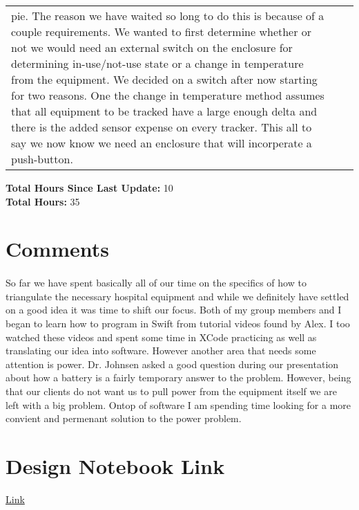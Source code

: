 \documentclass[11pt]{report}
\begin{document}
\begin{center}
{{\begin{tabular}{m{4cm} m{2cm} m{10cm}}
		pie.  The reason we have waited so long to do this is because of a couple requirements.  
		We wanted to first determine whether or not we would need an external switch on the 
		enclosure for determining in-use/not-use state or a change in temperature from the 
		equipment.  We decided on a switch after now starting for two reasons.  One the change 
		in temperature method assumes that all equipment to be tracked have a large enough delta 
		and there is the added sensor expense on every tracker.  This all to say we now know we 
		need an enclosure that will incorperate a push-button.\\
		\end{tabular}
		}
		}
	\end{center}
		\textbf{Total Hours Since Last Update: } 10\\
		\textbf{Total Hours: } 35

\newpage

\section*{Comments}
	\paragraph*{}
		So far we have spent basically all of our time on the specifics of how to triangulate the 
		necessary hospital equipment and while we definitely have settled on a good idea it was 
		time to shift our focus.  Both of my group members and I began to learn how to program in
		Swift from tutorial videos found by Alex.  I too watched these videos and spent some time 
		in XCode practicing as well as translating our idea into software.  However another area 
		that needs some attention is power.  Dr. Johnsen asked a good question during our 
		presentation about how a battery is a fairly temporary answer to the problem.  However, 
		being that our clients do not want us to pull power from the equipment itself we are left 
		with a big problem.  Ontop of software I am spending time looking for a more convient and 
		permenant solution to the power problem.

\section*{Design Notebook Link}
	\begin{center}
		\href{https://docs.google.com/document/d/1_15R62LK1jZ8SYRuCrb-5IObISIdbLSfoH2bRU7464c/edit?usp=sharing}{Link}
	\end{center}
\end{document}
